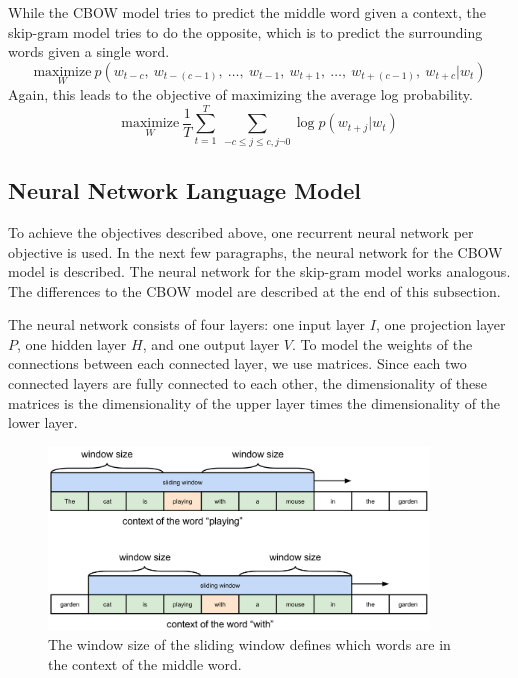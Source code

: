 While the CBOW model tries to predict the middle word given a context, the skip-gram model tries to do the opposite, which is to predict the surrounding words given a single word.
\begin{displaymath}
  \underset{W}{\text{maximize}}\ p(w_{t - c},\ w_{t - (c-1)},\ \ldots,\ w_{t - 1},\ w_{t + 1},\ \ldots,\ w_{t + (c-1)},\ w_{t + c} | w_{t})
\end{displaymath}
Again, this leads to the objective of maximizing the average log probability.
\begin{displaymath}
 \underset{W}{\text{maximize}}\ \frac{1}{T} \sum_{t=1}^{T}\ \sum_{-c \leq j \leq c, j \neg 0} \log p(w_{t + j}|w_{t})
\end{displaymath}

\subsection{Neural Network Language Model}

To achieve the objectives described above, one recurrent neural network per objective is used. In the next few paragraphs, the neural network for the CBOW model is described. The neural network for the skip-gram model works analogous. The differences to the CBOW model are described at the end of this subsection.

The neural network consists of four layers: one input layer $I$, one projection layer $P$, one hidden layer $H$, and one output layer $V$. To model the weights of the connections between each connected layer, we use matrices. Since each two connected layers are fully connected to each other, the dimensionality of these matrices is the dimensionality of the upper layer times the dimensionality of the lower layer.

\begin{figure}
	\centering
	\includegraphics[width=0.9\textwidth]{3preliminaries/sliding-window}
	\caption{The window size of the sliding window defines which words are in the context of the middle word.}
	\label{fig:3:sliding-window}
\end{figure}

